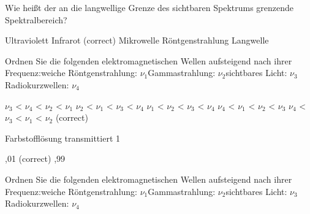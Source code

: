 \documentclass[11pt]{exam}
\begin{document}
\setlength{\voffset}{-0.5in}
\setlength{\headsep}{5pt}

\hspace{2mm}
 \hspace{5mm}
\vspace{4mm}

\begin{questions}

\question Wie heißt der an die langwellige Grenze des sichtbaren Spektrums grenzende Spektralbereich?

\begin{choices}
	\choice Ultraviolett
	\choice Infrarot (correct)
	\choice Mikrowelle
	\choice Röntgenstrahlung
	\choice Langwelle
\end{choices}

\vspace{3mm}\question Ordnen Sie die folgenden elektromagnetischen Wellen aufsteigend nach ihrer Frequenz:weiche Röntgenstrahlung: \( \nu_1 \)Gammastrahlung: \( \nu_2 \)sichtbares Licht: \( \nu_3 \)Radiokurzwellen: \( \nu_4 \)

\begin{choices}
	\choice \( \nu_3 \) < \( \nu_4 \) < \( \nu_2 \) < \( \nu_1 \)
	\choice \( \nu_2 \) < \( \nu_1 \) < \( \nu_3 \) < \( \nu_4 \)
	\choice \( \nu_1 \) < \( \nu_2 \) < \( \nu_3 \) < \( \nu_4 \)
	\choice \( \nu_4 \) < \( \nu_1 \) < \( \nu_2 \) < \( \nu_3 \)
	\choice \( \nu_4 \) < \( \nu_3 \) < \( \nu_1 \) < \( \nu_2 \) (correct)
\end{choices}

\vspace{3mm}\question Farbstofflösung transmittiert 1 %

\begin{choices}
	,01
	 (correct)
	,99
\end{choices}

\vspace{3mm}\question Ordnen Sie die folgenden elektromagnetischen Wellen aufsteigend nach ihrer Frequenz:weiche Röntgenstrahlung: \( \nu_1 \)Gammastrahlung: \( \nu_2 \)sichtbares Licht: \( \nu_3 \)Radiokurzwellen: \( \nu_4 \)


\end{questions}
\end{document}
